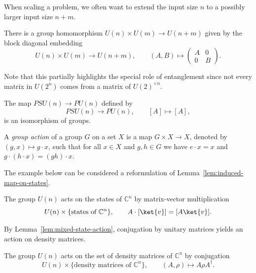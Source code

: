 \documentclass[a4paper,oneside, 12pt]{amsart}
\begin{document}
When scaling a problem, we often want to extend the input size \( n \) to a possibly larger input size \( n + m \).

\begin{example}\label{ex:tensor-product-of-unitary-groups}
  There is a group homomorphism \( U(n) \times U(m) \to U(n + m) \) given by the block diagonal embedding
  \begin{equation*}
    U(n) \times U(m) \to U(n + m), \qquad
    (A, B) \mapsto \begin{pmatrix}
      A & 0 \\
      0 & B
    \end{pmatrix}.
  \end{equation*}
\end{example}

Note that this partially highlights the special role of entanglement since not every matrix in \( U(2^n) \) comes from a matrix of \( U(2)^{\times n} \).

\begin{example}\label{ex:equiv-of-pun-sun}
  The map \( PSU(n) \to PU(n) \) defined by
  \begin{equation*}
    PSU(n) \to PU(n), \qquad  [A] \mapsto [A],
  \end{equation*}
  is an isomorphism of groups.
\end{example}

\begin{definition}\label{def:group-action}
  A \emph{group action} of a group \( G \) on a set \( X \) is a map \( G \times X \to X \), denoted by \( (g, x) \mapsto g \cdot x \), such that for all \(x\in X\) and \(g,h \in G\) we have \( e \cdot x = x \) and \( g \cdot (h \cdot x) = (gh) \cdot x \).
\end{definition}

The example below can be considered a reformulation of Lemma~\ref{lem:induced-map-on-states}.
\begin{example}\label{ex:states}
  The group \( U(n) \) acts on the states of \( \mathbb{C}^n \) by matrix-vector multiplication
  \begin{equation*}
    U(n) \times\{\text{states of } \mathbb{C}^{n}\}, \qquad   A \cdot [\ket{v}] = [A\ket{v}].
  \end{equation*}
\end{example}

By Lemma~\ref{lem:mixed-state-action}, conjugation by unitary matrices yields an action on density matrices.
\begin{example}\label{ex:group-action-on-mixed-states}
  The group \( U(n) \) acts on the set of density matrices of \( \mathbb{C}^n \) by conjugation
  \begin{equation*}
    U(n) \times\{\text{density matrices of } \mathbb{C}^{n}\}, \qquad
    (A, \rho) \mapsto A\rho A^{\dagger}.
  \end{equation*}
\end{example}
\end{document}
